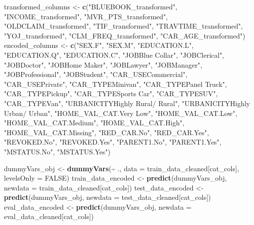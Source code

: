\documentclass[
]{article}
\newenvironment{Shaded}{\begin{snugshade}}{\end{snugshade}}
\newcommand{\AttributeTok}[1]{\textcolor[rgb]{0.13,0.29,0.53}{#1}}
\newcommand{\ConstantTok}[1]{\textcolor[rgb]{0.56,0.35,0.01}{#1}}
\newcommand{\FunctionTok}[1]{\textcolor[rgb]{0.13,0.29,0.53}{\textbf{#1}}}
\newcommand{\NormalTok}[1]{#1}
\newcommand{\OtherTok}[1]{\textcolor[rgb]{0.56,0.35,0.01}{#1}}
\newcommand{\SpecialCharTok}[1]{\textcolor[rgb]{0.81,0.36,0.00}{\textbf{#1}}}
\newcommand{\StringTok}[1]{\textcolor[rgb]{0.31,0.60,0.02}{#1}}
\begin{document}
\begin{Shaded}
\begin{Highlighting}[]
\NormalTok{transformed\_columns }\OtherTok{\textless{}{-}} \FunctionTok{c}\NormalTok{(}\StringTok{"BLUEBOOK\_transformed"}\NormalTok{, }\StringTok{"INCOME\_transformed"}\NormalTok{, }\StringTok{"MVR\_PTS\_transformed"}\NormalTok{, }
                         \StringTok{"OLDCLAIM\_transformed"}\NormalTok{, }\StringTok{"TIF\_transformed"}\NormalTok{, }\StringTok{"TRAVTIME\_transformed"}\NormalTok{, }
                         \StringTok{"YOJ\_transformed"}\NormalTok{, }\StringTok{"CLM\_FREQ\_transformed"}\NormalTok{, }\StringTok{"CAR\_AGE\_transformed"}\NormalTok{)}
\NormalTok{encoded\_columns }\OtherTok{\textless{}{-}} \FunctionTok{c}\NormalTok{(}\StringTok{"SEX.F"}\NormalTok{, }\StringTok{"SEX.M"}\NormalTok{, }\StringTok{"EDUCATION.L"}\NormalTok{, }\StringTok{"EDUCATION.Q"}\NormalTok{, }\StringTok{"EDUCATION.C"}\NormalTok{, }
                     \StringTok{"JOBBlue Collar"}\NormalTok{, }\StringTok{"JOBClerical"}\NormalTok{, }\StringTok{"JOBDoctor"}\NormalTok{, }\StringTok{"JOBHome Maker"}\NormalTok{, }\StringTok{"JOBLawyer"}\NormalTok{, }
                     \StringTok{"JOBManager"}\NormalTok{, }\StringTok{"JOBProfessional"}\NormalTok{, }\StringTok{"JOBStudent"}\NormalTok{, }\StringTok{"CAR\_USECommercial"}\NormalTok{, }
                     \StringTok{"CAR\_USEPrivate"}\NormalTok{, }\StringTok{"CAR\_TYPEMinivan"}\NormalTok{, }\StringTok{"CAR\_TYPEPanel Truck"}\NormalTok{, }\StringTok{"CAR\_TYPEPickup"}\NormalTok{, }
                     \StringTok{"CAR\_TYPESports Car"}\NormalTok{, }\StringTok{"CAR\_TYPESUV"}\NormalTok{, }\StringTok{"CAR\_TYPEVan"}\NormalTok{, }\StringTok{"URBANICITYHighly Rural/ Rural"}\NormalTok{, }
                     \StringTok{"URBANICITYHighly Urban/ Urban"}\NormalTok{, }\StringTok{"HOME\_VAL\_CAT.Very Low"}\NormalTok{, }\StringTok{"HOME\_VAL\_CAT.Low"}\NormalTok{, }
                     \StringTok{"HOME\_VAL\_CAT.Medium"}\NormalTok{, }\StringTok{"HOME\_VAL\_CAT.High"}\NormalTok{, }\StringTok{"HOME\_VAL\_CAT.Missing"}\NormalTok{, }\StringTok{"RED\_CAR.No"}\NormalTok{, }
                     \StringTok{"RED\_CAR.Yes"}\NormalTok{, }\StringTok{"REVOKED.No"}\NormalTok{, }\StringTok{"REVOKED.Yes"}\NormalTok{, }\StringTok{"PARENT1.No"}\NormalTok{, }\StringTok{"PARENT1.Yes"}\NormalTok{, }
                     \StringTok{"MSTATUS.No"}\NormalTok{, }\StringTok{"MSTATUS.Yes"}\NormalTok{)}


\NormalTok{dummyVars\_obj }\OtherTok{\textless{}{-}} \FunctionTok{dummyVars}\NormalTok{(}\SpecialCharTok{\textasciitilde{}}\NormalTok{ ., }\AttributeTok{data =}\NormalTok{ train\_data\_cleaned[cat\_cols], }\AttributeTok{levelsOnly =} \ConstantTok{FALSE}\NormalTok{)}
\NormalTok{train\_data\_encoded }\OtherTok{\textless{}{-}} \FunctionTok{predict}\NormalTok{(dummyVars\_obj, }\AttributeTok{newdata =}\NormalTok{ train\_data\_cleaned[cat\_cols])}
\NormalTok{test\_data\_encoded }\OtherTok{\textless{}{-}} \FunctionTok{predict}\NormalTok{(dummyVars\_obj, }\AttributeTok{newdata =}\NormalTok{ test\_data\_cleaned[cat\_cols])}
\NormalTok{eval\_data\_encoded }\OtherTok{\textless{}{-}} \FunctionTok{predict}\NormalTok{(dummyVars\_obj, }\AttributeTok{newdata =}\NormalTok{ eval\_data\_cleaned[cat\_cols])}



\end{Highlighting}
\end{Shaded}
\end{document}
